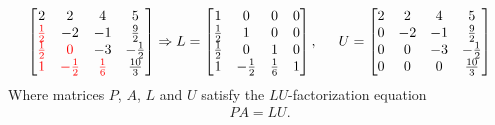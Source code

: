 \documentclass[11pt, letterpaper]{article}
\begin{document}
\begin{align*}
    \begin{bmatrix}
        2 & 2 & 4 & 5\\
        {\color{red}\frac{1}{2}}  & -2 & -1 & \frac{9}{2}\\
        {\color{red}\frac{1}{2}} & {\color{red}0} & -3& -\frac{1}{2}\\
        {\color{red}1}  & {\color{red}-\frac{1}{2}} & {\color{red}\frac{1}{6}} & \frac{10}{3}
    \end{bmatrix}
    \Rightarrow L=
    \begin{bmatrix}
        1 & 0 & 0 & 0\\
        \frac{1}{2} & 1 & 0 & 0\\
        \frac{1}{2} & 0 & 1 & 0\\
        1 & -\frac{1}{2} & \frac{1}{6} & 1
    \end{bmatrix}
    ,\indent U=
    \begin{bmatrix}
        2 & 2 & 4 & 5\\
        0 & -2 & -1 & \frac{9}{2}\\
        0 & 0 & -3 & -\frac{1}{2}\\
        0 & 0 & 0 & \frac{10}{3}
    \end{bmatrix}
\end{align*}
Where matrices $P$, $A$, $L$ and $U$ satisfy the $LU$-factorization equation
\begin{align*}
    PA=LU.
\end{align*}
\end{document}

